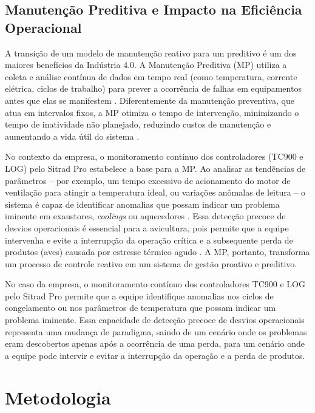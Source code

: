 \documentclass[12pt]{article}
\begin{document}
\subsection{Manutenção Preditiva e Impacto na Eficiência Operacional}

A transição de um modelo de manutenção reativo para um preditivo é um dos maiores benefícios da Indústria 4.0. A Manutenção Preditiva (MP) utiliza a coleta e análise contínua de dados em tempo real (como temperatura, corrente elétrica, ciclos de trabalho) para prever a ocorrência de falhas em equipamentos antes que elas se manifestem \cite{ABDELSALAM_2024}. Diferentemente da manutenção preventiva, que atua em intervalos fixos, a MP otimiza o tempo de intervenção, minimizando o tempo de inatividade não planejado, reduzindo custos de manutenção e aumentando a vida útil do sistema \cite{CAMPOS_SILVA_2021}.

No contexto da empresa, o monitoramento contínuo dos controladores (TC900 e LOG) pelo Sitrad Pro estabelece a base para a MP. Ao analisar as tendências de parâmetros – por exemplo, um tempo excessivo de acionamento do motor de ventilação para atingir a temperatura ideal, ou variações anômalas de leitura – o sistema é capaz de identificar anomalias que possam indicar um problema iminente em exaustores, \textit{coolings} ou aquecedores \cite{baldissarelli2019}. Essa detecção precoce de desvios operacionais é essencial para a avicultura, pois permite que a equipe intervenha e evite a interrupção da operação crítica e a subsequente perda de produtos (aves) causada por estresse térmico agudo \cite{NAAS_2007}. A MP, portanto, transforma um processo de controle reativo em um sistema de gestão proativo e preditivo.

No caso da empresa, o monitoramento contínuo dos controladores TC900 e LOG pelo Sitrad Pro permite que a equipe identifique anomalias nos ciclos de congelamento ou nos parâmetros de temperatura que possam indicar um problema iminente. Essa capacidade de detecção precoce de desvios operacionais representa uma mudança de paradigma, saindo de um cenário onde os problemas eram descobertos apenas após a ocorrência de uma perda, para um cenário onde a equipe pode intervir e evitar a interrupção da operação e a perda de produtos.

\section{Metodologia} \label{sec:metodologia}
\end{document}
